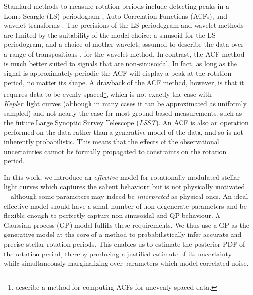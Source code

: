 \documentclass[useAMS, usenatbib, preprint, 12pt]{aastex}
\newcommand{\Kepler}{{\it Kepler}}
\newcommand{\LSST}{{\it LSST}}
\newcommand{\eg}{{\it e.g.}}
\begin{document}
Standard methods to measure rotation periods include detecting
peaks in a Lomb-Scargle \citep{Lomb1976, Scargle1982} (LS) periodogram
\citep[e.g.][]{Reinhold2013}, Auto-Correlation Functions (ACFs),
\citep{Mcquillan13b} and wavelet transforms \citep{Garcia2014}.
The precisions of the LS periodogram and wavelet methods are limited by the
suitability of the model choice: a sinusoid for the LS periodogram,
and a choice of mother wavelet, assumed to describe the data
over a range of transpositions \citep[see, \eg][]{Carter2010},
for the wavelet method.
In contrast, the ACF method is much better suited to signals that are
non-sinusoidal.
In fact, as long as the signal is approximately periodic the ACF will
display a peak at the rotation period, no matter its shape.
A drawback of the ACF method, however, is that it requires data to be
evenly-spaced\footnote{\citet{Edelson1988} describe a method for computing
ACFs for unevenly-spaced data.}, which is not exactly the case with \Kepler\
light curves (although in many cases it can be approximated as uniformly
sampled) and not nearly the case for most ground-based measurements, such
as the future Large Synoptic Survey Telescope (\LSST).
An ACF is also an operation performed on the data rather than a generative
model of the data, and so is not inherently probabilistic.
This means that the effects of the observational uncertainties cannot be
formally propagated to constraints on the rotation period.

In this work, we introduce an {\it effective} model for rotationally
modulated stellar light curves
which captures the salient behaviour but is not
physically motivated---although some parameters may indeed be
{\it interpreted} as physical ones.
An ideal effective model should have a small number of non-degenerate parameters
and be flexible enough to perfectly capture non-sinusoidal and QP behaviour.
A Gaussian process (GP) model fulfills these requirements. We thus use a GP
as the generative model at the core of a method to probabilistically
infer accurate and precise stellar rotation periods.  This enables us to
estimate the posterior PDF of the rotation period, thereby producing a
justified estimate of its uncertainty while simultaneously marginalizing over
parameters which model correlated noise.
\end{document}
